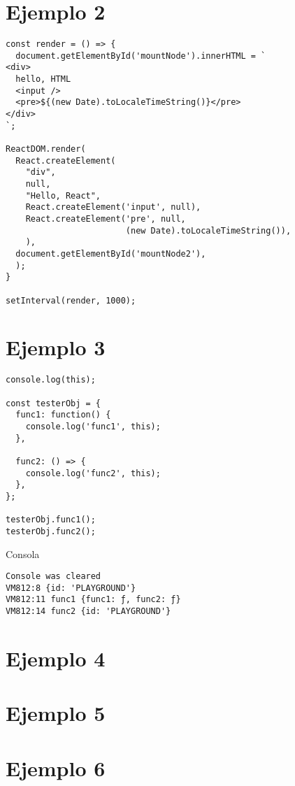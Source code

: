 \documentclass[10pt]{article} %
\begin{document}
\section{Ejemplo 2}
\begin{verbatim}
const render = () => {
  document.getElementById('mountNode').innerHTML = `
<div>
  hello, HTML
  <input />
  <pre>${(new Date).toLocaleTimeString()}</pre>
</div>
`;

ReactDOM.render(
  React.createElement(
    "div",
    null,
    "Hello, React",
    React.createElement('input', null),
    React.createElement('pre', null,
                        (new Date).toLocaleTimeString()),
    ),
  document.getElementById('mountNode2'),
  );
}

setInterval(render, 1000);
\end{verbatim}

\section{Ejemplo 3}
\begin{verbatim}
console.log(this);

const testerObj = {
  func1: function() {
    console.log('func1', this);
  },
  
  func2: () => {
    console.log('func2', this);
  },
};

testerObj.func1();
testerObj.func2();
\end{verbatim}
Consola
\begin{verbatim}
Console was cleared
VM812:8 {id: 'PLAYGROUND'}
VM812:11 func1 {func1: ƒ, func2: ƒ}
VM812:14 func2 {id: 'PLAYGROUND'}
\end{verbatim}
\section{Ejemplo 4}

\section{Ejemplo 5}

\section{Ejemplo 6}
\end{document}
